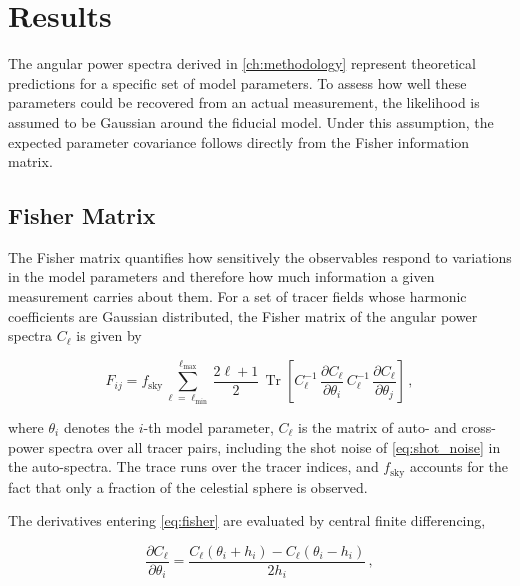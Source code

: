 \chapter{Results} \label{ch:results}
The angular power spectra derived in \autoref{ch:methodology} represent theoretical predictions 
for a specific set of model parameters. To assess how well these parameters could be recovered 
from an actual measurement, the likelihood is assumed to be Gaussian around the fiducial model. 
Under this assumption, the expected parameter covariance follows directly from the Fisher 
information matrix. 

\section{Fisher Matrix} \label{sec:fisher_matrix}
The Fisher matrix quantifies how sensitively the observables respond to variations in the model
parameters and therefore how much information a given measurement carries about them. For a set
of tracer fields whose harmonic coefficients are Gaussian distributed, the Fisher matrix of the
angular power spectra $C_\ell$ is given by~\cite{Tegmark_1997, Reischke_2021}

\begin{equation}\label{eq:fisher}
    F_{ij}
    =
    f_{\mathrm{sky}}
    \sum_{\ell=\ell_{\mathrm{min}}}^{\ell_{\mathrm{max}}}
    \frac{2\ell+1}{2}\,
    \operatorname{Tr}
    \left[
        C_{\ell}^{-1}\,
        \frac{\partial C_{\ell}}{\partial \theta_i}\,
        C_{\ell}^{-1}\,
        \frac{\partial C_{\ell}}{\partial \theta_j}
    \right] \,,
\end{equation}

where $\theta_i$ denotes the $i$-th model parameter, $C_\ell$ is the matrix of auto- and
cross-power spectra over all tracer pairs, including the shot noise of \autoref{eq:shot_noise} in the auto-spectra. The trace runs over the tracer indices, and
$f_{\mathrm{sky}}$ accounts for the fact that only a fraction of the celestial sphere is observed.

The derivatives entering \autoref{eq:fisher} are evaluated by central finite differencing,

\begin{equation}\label{eq:finite_difference}
    \frac{\partial C_{\ell}}{\partial \theta_i}
    =
    \frac{C_{\ell}(\theta_i + h_i) - C_{\ell}(\theta_i - h_i)}{2 h_i} \,,
\end{equation}

